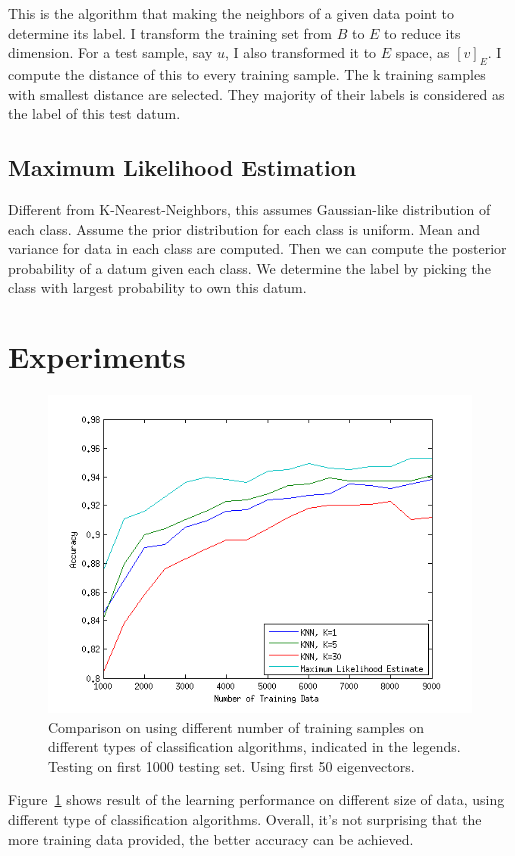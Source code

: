 \documentclass[10pt]{article}
\begin{document}
This is the algorithm that making the neighbors of a given data point
to determine its label. I transform the training set from $B$ to $E$ to
reduce its dimension. For a test sample, say $u$, I also transformed
it to $E$ space, as $[v]_E$. I compute the distance of this to every
training sample. The k training samples with smallest distance are
selected. They majority of their labels is considered as the label of
this test datum.

\subsection{Maximum Likelihood Estimation}

Different from K-Nearest-Neighbors, this assumes Gaussian-like
distribution of each class. Assume the prior distribution for each class
is uniform. Mean and variance for data in each class
are computed. Then we can compute the posterior probability of a datum
given each class. We determine the label by picking the class with
largest probability to own this datum.

\section{Experiments}

\begin{figure}
\centering
\includegraphics[width=0.55\columnwidth]{diffDataSet.png}
\caption{Comparison on using different number of training samples on
different types of classification algorithms, indicated in the legends.
Testing on first 1000 testing set. Using first 50 eigenvectors.}
\label{fig:dataset}
\end{figure}

Figure~\ref{fig:dataset} shows result of the learning performance on
different size of data, using different type of classification
algorithms. Overall, it's not surprising that the more training data
provided, the better accuracy can be achieved.
\end{document}
